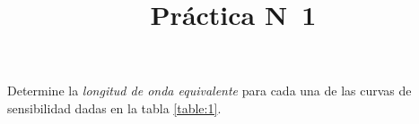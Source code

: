\documentclass[12pt,a4paper]{practice}
\begin{document}
    \title{Práctica N\textdegree\ 1}
    \maketitle

    \begin{problem}\label{prob:1}
        Determine la \emph{longitud de onda equivalente} para cada una de las curvas de sensibilidad dadas en la tabla \ref{table:1}.


\end{problem}
\end{document}

